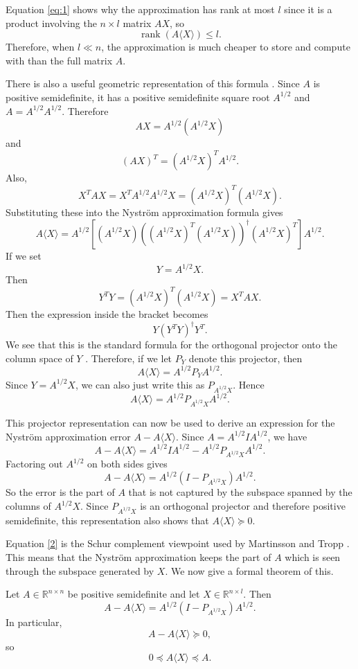 Equation \eqref{eq:1} shows why the approximation has rank at most $l$ since it is a product involving the $n\times l$ matrix $AX$, so
\[
\operatorname{rank}(A\langle X\rangle)\leq l.
\]
Therefore, when $l\ll n$, the approximation is much cheaper to store and compute with than the full matrix $A$.

There is also a useful geometric representation of this formula \citep[Section~14]{martinsson2020randomized}. Since $A$ is positive semidefinite, it has a positive semidefinite square root $A^{1/2}$ and $A=A^{1/2}A^{1/2}$. Therefore
\[
AX=A^{1/2}(A^{1/2}X)
\]
and
\[
(AX)^T=(A^{1/2}X)^T A^{1/2}.
\]
Also,
\[
X^TAX=X^TA^{1/2}A^{1/2}X=(A^{1/2}X)^T(A^{1/2}X).
\]
Substituting these into the Nystr\"om approximation formula gives
\[
A\langle X\rangle=A^{1/2}[(A^{1/2}X)((A^{1/2}X)^T(A^{1/2}X))^\dagger
(A^{1/2}X)^T]A^{1/2}.
\]
If we set
\[
Y=A^{1/2}X.
\]
Then
\[
Y^TY=(A^{1/2}X)^T(A^{1/2}X)=X^TAX.
\]
Then the expression inside the bracket becomes
\[
Y(Y^TY)^\dagger Y^T.
\]
We see that this is the standard formula for the orthogonal projector onto the column space of $Y$ \citep{trefethen1997numerical}. Therefore, if we let $P_Y$ denote this projector, then 
\[
A\langle X\rangle=A^{1/2}P_Y A^{1/2}.
\]
Since $Y=A^{1/2}X$, we can also just write this as $P_{A^{1/2}X}$. Hence
\[
A\langle X\rangle=A^{1/2}P_{A^{1/2}X}A^{1/2}.
\]

This projector representation can now be used to derive an expression for the Nystr\"om approximation error $A-A\langle X\rangle$. Since $A=A^{1/2}IA^{1/2}$, we have
\[
A-A\langle X\rangle
=
A^{1/2}IA^{1/2}
-
A^{1/2}P_{A^{1/2}X}A^{1/2}.
\]
Factoring out $A^{1/2}$ on both sides gives
\begin{equation}
A-A\langle X\rangle
=
A^{1/2}(I-P_{A^{1/2}X})A^{1/2}.
\label{2}
\end{equation}
So the error is the part of $A$ that is not captured by the subspace spanned by the columns of $A^{1/2}X$.
Since $P_{A^{1/2}X}$ is an orthogonal projector and therefore positive semidefinite, this representation also shows that $A\langle X\rangle \succeq 0$.

Equation \eqref{2} is the Schur complement viewpoint used by Martinsson and Tropp \citep{martinsson2020randomized}. This means that the Nystr\"om approximation keeps the part of $A$ which is seen through the subspace generated by $X$. We now give a formal theorem of this.

\begin{theorem}
Let $A\in\mathbb{R}^{n\times n}$ be positive semidefinite and let $X\in\mathbb{R}^{n\times l}$. Then
\[
A-A\langle X\rangle=A^{1/2}(I-P_{A^{1/2}X})A^{1/2}.
\]
In particular,
\[
A-A\langle X\rangle\succeq0,
\]
so
\[
0\preceq A\langle X\rangle\preceq A.
\]
\end{theorem}

